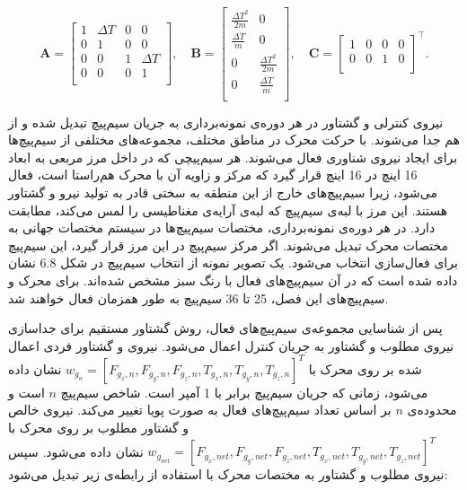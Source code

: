 \[
\bm{A} =
\begin{bmatrix}
	1 & \Delta T & 0 & 0 \\
	0 & 1 & 0 & 0 \\
	0 & 0 & 1 & \Delta T \\
	0 & 0 & 0 & 1 \\
\end{bmatrix},
\quad
\bm{B} =
\begin{bmatrix}
	\frac{\Delta T^2}{2m} & 0 \\
	\frac{\Delta T}{m} & 0 \\
	0 & \frac{\Delta T^2}{2m} \\
	0 & \frac{\Delta T}{m} \\
\end{bmatrix},
\quad
\bm{C} =
\begin{bmatrix}
	1 & 0 & 0 & 0 \\
	0 & 0 & 1 & 0 \\
\end{bmatrix}^\top.
\]

نیروی کنترلی و گشتاور در هر دوره‌ی نمونه‌برداری به جریان سیم‌پیچ تبدیل شده و از هم جدا می‌شوند. با حرکت محرک در مناطق مختلف، مجموعه‌های مختلفی از سیم‌پیچ‌ها برای ایجاد نیروی شناوری فعال می‌شوند. هر سیم‌پیچی که در داخل مرز مربعی به ابعاد 16 اینچ در 16 اینچ قرار گیرد که مرکز و زاویه آن با محرک هم‌راستا است، فعال می‌شود، زیرا سیم‌پیچ‌های خارج از این منطقه به سختی قادر به تولید نیرو و گشتاور هستند. این مرز با لبه‌ی سیم‌پیچ که لبه‌ی آرایه‌ی مغناطیسی را لمس می‌کند، مطابقت دارد. در هر دوره‌ی نمونه‌برداری، مختصات سیم‌پیچ‌ها در سیستم مختصات جهانی به مختصات محرک تبدیل می‌شوند. اگر مرکز سیم‌پیچ در این مرز قرار گیرد، این سیم‌پیچ برای فعال‌سازی انتخاب می‌شود. یک تصویر نمونه از انتخاب سیم‌پیچ در شکل 6.8 نشان داده شده است که در آن سیم‌پیچ‌های فعال با رنگ سبز مشخص شده‌اند. برای محرک و سیم‌پیچ‌های این فصل، 25 تا 36 سیم‌پیچ به طور همزمان فعال خواهند شد.

پس از شناسایی مجموعه‌ی سیم‌پیچ‌های فعال، روش گشتاور مستقیم برای جداسازی نیروی مطلوب و گشتاور به جریان کنترل اعمال می‌شود. نیروی و گشتاور فردی اعمال شده بر روی محرک با
 \( w_g_n = [F_{g_x,n}, F_{g_y,n}, F_{g_z,n}, T_{g_x,n}, T_{g_y,n}, T_{g_z,n}]^T \)
  نشان داده می‌شود، زمانی که جریان سیم‌پیچ برابر با 1 آمپر است. شاخص سیم‌پیچ \( n \) است و محدوده‌ی \( n \) بر اساس تعداد سیم‌پیچ‌های فعال به صورت پویا تغییر می‌کند. نیروی خالص و گشتاور مطلوب بر روی محرک با \( w_g_{net} = [F_{g_x,net}, F_{g_y,net}, F_{g_z,net}, T_{g_x,net}, T_{g_y,net}, T_{g_z,net}]^T \) نشان داده می‌شود. سپس نیروی مطلوب و گشتاور به مختصات محرک با استفاده از رابطه‌ی زیر تبدیل می‌شود:

